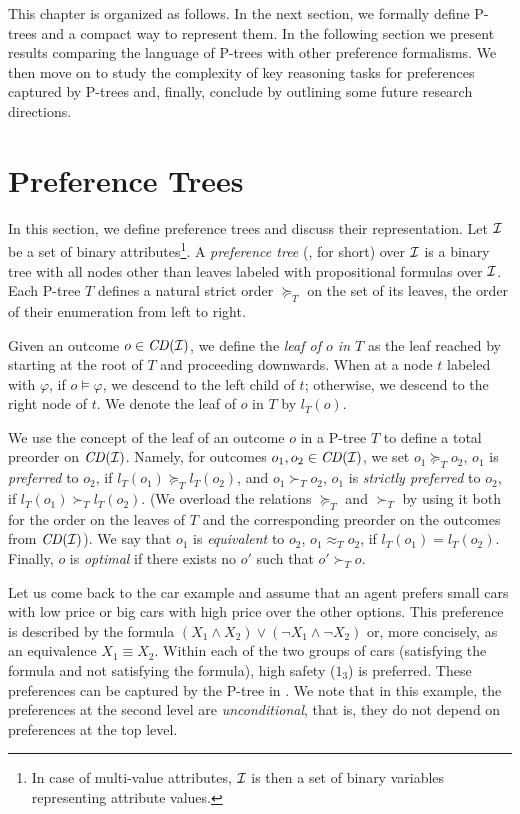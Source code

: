 This chapter is organized as follows. In the next section, we formally 
define P-trees and a compact way to represent them. In the following 
section we present results comparing the language of P-trees with other 
preference formalisms. We then move on to study the complexity of key 
reasoning tasks for preferences captured by P-trees and, finally, 
conclude by outlining some future research directions.


\section{Preference Trees}

In this section, we define preference trees and discuss their
representation. Let $\mathcal{I}$ be a set of binary attributes\footnote{
	In case of multi-value attributes, $\mathcal{I}$ is then a set of
	binary variables representing attribute values.
}. 
A \emph{preference tree} (, for short) over $\mathcal{I}$ is
a binary tree with all nodes other than 
leaves labeled with propositional formulas over $\mathcal{I}$. Each P-tree 
$T$ defines a natural strict order $\succeq_T$ on the set of its leaves, 
the order of their enumeration from left to right. 

Given an outcome $o \in \mathit{CD}(\mathcal{I})$, we define the \emph{leaf of $o$ in $T$}
as the leaf reached by starting at the root of $T$ and proceeding 
downwards. When at a node $t$ labeled with $\varphi$, if $o\models \varphi$, 
we descend to the left child of $t$; otherwise, we descend to the right node 
of $t$. We denote the leaf of $o$ in $T$ by $l_T(o)$.

We use the concept of the leaf of an outcome $o$ in a P-tree $T$ to 
define a total preorder on $\mathit{CD}(\mathcal{I})$. Namely, for outcomes
$o_1, o_2\in \mathit{CD}(\mathcal{I})$, 
we set $o_1\succeq_T o_2$, $o_1$ is \emph{preferred} to $o_2$, if $l_T(o_1) \succeq_T l_T(o_2)$, and
$o_1\succ_T o_2$, $o_1$ is \emph{strictly preferred} to $o_2$, 
if $l_T(o_1) \succ_T l_T(o_2)$.
(We overload the relations $\succeq_T$ and $\succ_T$ 
by using it both for the order on the leaves of $T$ 
and the corresponding preorder on the outcomes from $\mathit{CD}(\mathcal{I})$). 
We say that $o_1$ is 
\emph{equivalent} to $o_2$, $o_1 \approx_T o_2$, if $l_T(o_1)=l_T(o_2)$. 
Finally, $o$ is \emph{optimal} if there exists no 
$o'$ such that $o' \succ_T o$.

Let us come back to the car example and assume that an agent 
prefers small cars with low price or big cars with high price
over the other options. This preference is described by the formula
$(X_1\land X_2) \lor (\neg X_1 \land \neg X_2)$ or, more concisely, as 
an equivalence $X_1 \equiv X_2$.
Within each of the two groups of cars 
(satisfying the formula and not satisfying the formula), 
high safety ($1_3$) is preferred. These preferences can be captured by the P-tree in
. We note that in this example, the preferences at 
the second level are \emph{unconditional}, that is, they do not depend on 
preferences at the top level. 

